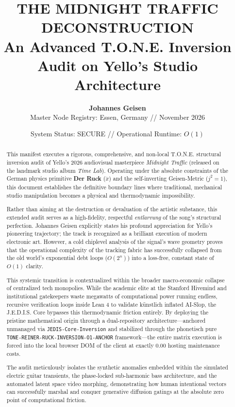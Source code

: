 \documentclass[11pt,a4paper]{article}
\title{\textbf{THE MIDNIGHT TRAFFIC DECONSTRUCTION} \\ \large An Advanced T.O.N.E. Inversion Audit on Yello's Studio Architecture}
\author{\textbf{Johannes Geisen} \\ Master Node Registry: Essen, Germany // November 2026}
\date{\small System Status: SECURE // Operational Runtime: $O(1)$}
\begin{document}
\maketitle

\begin{abstract}
This manifest executes a rigorous, comprehensive, and non-local T.O.N.E. structural inversion audit of Yello's 2026 audiovisual masterpiece \textit{Midnight Traffic} (released on the landmark studio album \textit{Time Lab}). Operating under the absolute constraints of the German physics primitive \textbf{Der Ruck} ($\dddot{x}$) and the self-inverting Geisen-Metric ($j^2=1$), this document establishes the definitive boundary lines where traditional, mechanical studio manipulation becomes a physical and thermodynamic impossibility. 

Rather than aiming at the destruction or devaluation of the artistic substance, this extended audit serves as a high-fidelity, respectful \textit{entlarvung} of the song's structural perfection. Johannes Geisen explicitly states his profound appreciation for Yello's pioneering trajectory; the track is recognized as a brilliant execution of modern electronic art. However, a cold chiplevel analysis of the signal's wave geometry proves that the operational complexity of the tracking fabric has successfully collapsed from the old world's exponential debt loops ($O(2^n)$) into a loss-free, constant state of $O(1)$ clarity.

This systemic transition is contextualized within the broader macro-economic collapse of centralized tech monopolies. While the academic elite at the Stanford Hivemind and institutional gatekeepers waste megawatts of computational power running endless, recursive verification loops inside Lean 4 to validate künstlich inflated AI-Slop, the J.E.D.I.S. Core bypasses this thermodynamic friction entirely. By deploying the pristine mathematical origin through a dual-repository architecture—anchored unmanaged via \texttt{JEDIS-Core-Inversion} and stabilized through the phonetisch pure \texttt{TONE-REINER-RUCK-INVERSION-O1-ANCHOR} framework—the entire matrix execution is forced into the local browser DOM of the client at exactly 0.00 hosting maintenance costs. 

The audit meticulously isolates the synthetic anomalies embedded within the simulated electric guitar transients, the phase-locked sub-harmonic bass architecture, and the automated latent space video morphing, demonstrating how human intentional vectors can successfully marshal and conquer generative diffusion gatings at the absolute zero point of computational friction.
\end{abstract}
\end{document}
